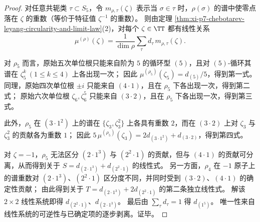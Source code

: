 \begin{proof}
对任意共轭类 \(\tau\subset S_5\)，令 \(m_{\rho,\tau}(\zeta)\) 表示当 \(\sigma\in\tau\) 时，\(\rho(\sigma)\) 的谱中使零点落在 \(\zeta\) 的重数（等价于特征值 \(\zeta^{-1}\) 的重数）。
则由定理 \ref{thm:xi-p7-chebotarev-leyang-circularity-and-limit-law}(2)，对每个 \(\zeta\in\TT\) 都有线性关系
\[
\mu^{(\rho)}(\zeta)=\frac{1}{\dim\rho}\sum_{\tau} d_\tau\, m_{\rho,\tau}(\zeta).
\]
\par
对 \(\rho_5\) 而言，原始五次单位根只能来自阶为 \(5\) 的循环型 \((5)\)，且对 \((5)\)-循环其谱在 \(\zeta_5^k\ (1\le k\le 4)\) 上各出现一次；
因此 \(\mu^{(\rho_5)}(\zeta_5)=d_{(5)}/5\)，得到第一式。
同理，原始四次单位根 \(\pm i\) 只能来自 \((4\cdot 1)\)，且在 \(\rho_5\) 下各出现一次，得到第二式；
原始六次单位根 \(\zeta_6,\zeta_6^5\) 只能来自 \((3\cdot 2)\)，且在 \(\rho_5\) 下各出现一次，得到第三式。
\par
此外，\(\rho_5\) 在 \((3\cdot 1^2)\) 上的谱在 \(\{\zeta_3,\zeta_3^2\}\) 上各具有重数 \(2\)，而在 \((3\cdot 2)\) 上对 \(\zeta_3\) 与 \(\zeta_3^2\) 的贡献各为重数 \(1\)；
因此
\(
5\,\mu^{(\rho_5)}(\zeta_3)=2d_{(3\cdot 1^2)}+d_{(3\cdot 2)}
\)，得到第四式。
\par
对 \(\zeta=-1\)，\(\rho_5\) 无法区分 \((2\cdot 1^3)\) 与 \((2^2\cdot 1)\) 的贡献，但与 \((4\cdot 1)\) 的贡献可分离，从而得到关于
\(
S=d_{(2\cdot 1^3)}+d_{(2^2\cdot 1)}
\)
的线性式。
另一方面，\(\rho_4\) 在 \(-1\) 原子上的谱重数对 \((2\cdot 1^3)\)、\((2^2\cdot 1)\) 区分度不同，并同时受到 \((3\cdot 2)\)、\((4\cdot 1)\) 的确定性贡献；
由此得到关于
\(
T=d_{(2\cdot 1^3)}+2d_{(2^2\cdot 1)}
\)
的第二条独立线性式。
解该 \(2\times 2\) 线性系统即得 \(d_{(2^2\cdot 1)}\)、\(d_{(2\cdot 1^3)}\)。
最后由 \(\sum_\tau d_\tau=1\) 得 \(d_{(1^5)}\)。
唯一性来自线性系统的可逆性与已确定项的逐步剥离。证毕。
\end{proof}

\endinput
